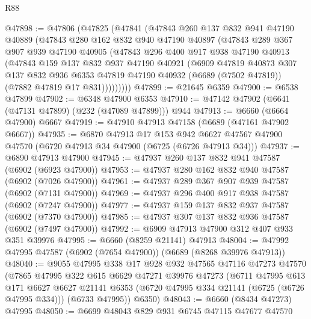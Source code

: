 \begin{lexlean}{R88}
\begin{coremodule}
@47898 := @47806
    (@47825
      (@47841
        (@47843
          @260
          @137
          @832
          @941
          @47190
          @40889
          (@47843
            @280
            @162
            @832
            @940
            @47190
            @40897
            (@47843
              @289
              @367
              @907
              @939
              @47190
              @40905
              (@47843
                @296
                @400
                @917
                @938
                @47190
                @40913
                (@47843
                  @159
                  @137
                  @832
                  @937
                  @47190
                  @40921
                  (@6909
                    @47819
                    @40873
                    @307
                    @137
                    @832
                    @936
                    @6353
                    @47819
                    @47190
                    @40932
                    (@6689 (@7502 @47819))
                    (@7882 @47819 @17 @831)))))))))
@47899 := @21645 @6359
@47900 := @6538 @47899
@47902 := @6348 @47900 @6353
@47910 := @47142 @47902 (@6641 (@47131 @47899) (@232 (@47089 @47899))) @944
@47913 := @6660 (@6664 @47900) @6667
@47919 := @47910 @47913 @47158 (@6689 (@47161 @47902 @6667))
@47935 := @6870
    @47913
    @17
    @153
    @942
    @6627
    @47567
    @47900
    @47570
    (@6720 @47913 @34 @47900 (@6725 (@6726 @47913 @34)))
@47937 := @6890 @47913 @47900
@47945 := @47937 @260 @137 @832 @941 @47587 (@6902 (@6923 @47900))
@47953 := @47937 @280 @162 @832 @940 @47587 (@6902 (@7026 @47900))
@47961 := @47937 @289 @367 @907 @939 @47587 (@6902 (@7131 @47900))
@47969 := @47937 @296 @400 @917 @938 @47587 (@6902 (@7247 @47900))
@47977 := @47937 @159 @137 @832 @937 @47587 (@6902 (@7370 @47900))
@47985 := @47937 @307 @137 @832 @936 @47587 (@6902 (@7497 @47900))
@47992 := @6909 @47913 @47900 @312 @407 @933 @351 @39976
@47995 := @6660 (@8259 @21141) @47913
@48004 := @47992 @47995 @47587 (@6902 (@7654 @47900)) (@6689 (@8268 @39976 @47913))
@48040 := @9055
    @47995
    @338
    @17
    @928
    @932
    @47565
    @47116
    @47273
    @47570
    (@7865
      @47995
      @322
      @615
      @6629
      @47271
      @39976
      @47273
      (@6711
        @47995
        @613
        @171
        @6627
        @6627
        @21141
        @6353
        (@6720 @47995 @334 @21141 (@6725 (@6726 @47995 @334)))
        (@6733 @47995))
      @6350)
@48043 := @6660 (@8434 @47273) @47995
@48050 := @6699 @48043 @829 @931 @6745 @47115 @47677 @47570

\end{coremodule}
\end{lexlean}
